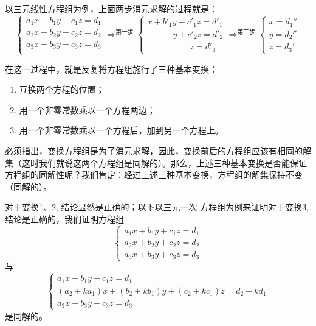 以三元线性方程组为例，上面两步消元求解的过程就是：
\[\begin{cases}
    a_1x+b_1y+c_1z=d_1\\
    a_2x+b_2y+c_2z=d_2\\
    a_3x+b_3y+c_3z=d_3\\
\end{cases}\mathop{\Longrightarrow}^{\text{第一步}} \begin{cases}
    x+b'_1y+c'_1z=d'_1\\
  \qquad \quad  y+c'_2z=d'_2\\
  \qquad \qquad \quad  z=d'_3
\end{cases}\mathop{\Longrightarrow}^{\text{第二步}}  \begin{cases}
    x=d_1''\\ y=d_2''\\ z=d_3'
\end{cases}\]

在这一过程中，就是反复将方程组施行了三种基本变换：
\begin{enumerate}
    \item 互换两个方程的位置；
    \item 用一个非零常数乘以一个方程两边；
    \item 用一个非零常数乘以一个方程后，加到另一个方程上。
\end{enumerate}

必须指出，变换方程组是为了消元求解，因此，变换前后的方程组应该有相同的解集（这时我们就说这两个方程组是同解的）。那么，上述三种基本变换是否能保证方程组的同解性呢？我们肯定：经过上述三种基本变换，方程组的解集保持不变（同解的）。

对于变换1、2, 结论显然是正确的；以下以三元一次
方程组为例来证明对于变换3, 结论是正确的，我们证明方程组
\begin{equation}
    \begin{cases}
      a_1x+b_1y+c_1z=d_1\\    a_2x+b_2y+c_2z=d_2\\    a_3x+b_3y+c_3z=d_3
    \end{cases}
\end{equation}
与
\begin{equation}
    \begin{cases}
        a_1x+b_1y+c_1z=d_1\\   (a_2+ka_1)x+(b_2+kb_1)y+(c_2+kc_1)z=d_2+kd_1\\
        a_3x+b_3y+c_3z=d_3
    \end{cases} 
\end{equation}
是同解的。

